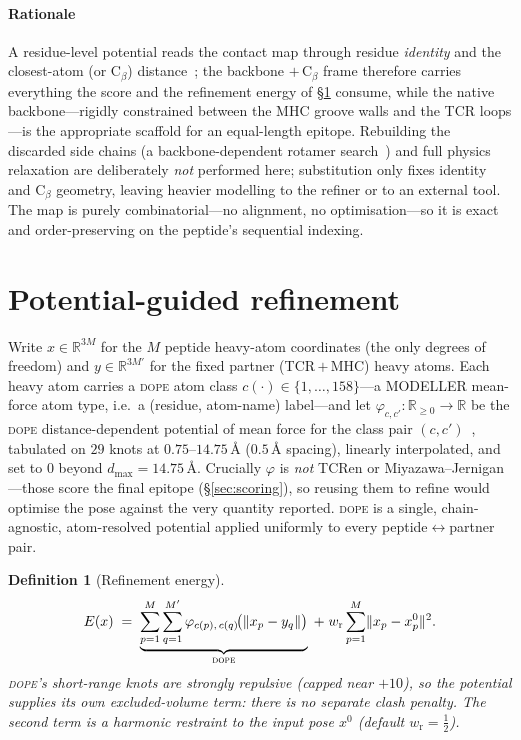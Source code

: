 \documentclass[11pt]{article}
\theoremstyle{oldplain}
\theoremstyle{oldrem}
\newtheorem{definition}{Definition}
\newcommand{\R}{\mathbb{R}}
\newcommand{\xref}{x^{0}}
\begin{document}
\paragraph{Rationale} A residue-level potential reads the contact map through residue
\emph{identity} and the closest-atom (or $\mathrm C_\beta$) distance~\cite{Miyazawa1996}; the
backbone $+\,\mathrm C_\beta$ frame therefore carries everything the score and the refinement energy
of \S\ref{sec:refine} consume, while the native backbone---rigidly constrained between the MHC
groove walls and the TCR loops---is the appropriate scaffold for an equal-length epitope. Rebuilding
the discarded side chains (a backbone-dependent rotamer search~\cite{Shapovalov2011}) and full
physics relaxation are deliberately \emph{not} performed here; substitution only fixes identity and
$\mathrm C_\beta$ geometry, leaving heavier modelling to the refiner or to an external tool. The map
is purely combinatorial---no alignment, no optimisation---so it is exact and order-preserving on the
peptide's sequential indexing.

\section{Potential-guided refinement}\label{sec:refine}
Write $x\in\R^{3M}$ for the $M$ peptide heavy-atom coordinates (the only degrees of freedom) and
$y\in\R^{3M'}$ for the fixed partner (TCR\,$+$\,MHC) heavy atoms. Each heavy atom carries a
\textsc{dope} atom class $c(\cdot)\in\{1,\dots,158\}$---a MODELLER mean-force atom type, i.e.\ a
(residue, atom-name) label---and let $\varphi_{c,c'}:\R_{\ge0}\to\R$ be the \textsc{dope}
distance-dependent potential of mean force for the class pair $(c,c')$~\cite{Shen2006}, tabulated on
$29$ knots at $0.75$--$14.75\,\text{\AA}$ ($0.5\,\text{\AA}$ spacing), linearly interpolated, and set
to $0$ beyond $d_{\max}=14.75\,\text{\AA}$. Crucially $\varphi$ is \emph{not} TCRen or
Miyazawa--Jernigan---those score the final epitope (\S\ref{sec:scoring}), so reusing them to refine
would optimise the pose against the very quantity reported. \textsc{dope} is a single, chain-agnostic,
atom-resolved potential applied uniformly to every peptide$\leftrightarrow$partner pair.
\begin{definition}[Refinement energy]\label{def:energy}
\[
  E(x) \;=\;
  \underbrace{\sum_{p=1}^{M}\sum_{q=1}^{M'} \varphi_{c(p),\,c(q)}\!\bigl(\lVert x_p - y_q\rVert\bigr)}_{\text{\textsc{dope}}}
  \;+\;
  w_{\mathrm r}\sum_{p=1}^{M}\lVert x_p-\xref_p\rVert^2 .
\]
\textsc{dope}'s short-range knots are strongly repulsive (capped near $+10$), so the potential
supplies its own excluded-volume term: there is no separate clash penalty. The second term is a
harmonic restraint to the input pose $\xref$ (default $w_{\mathrm r}=\tfrac12$).
\end{definition}
\end{document}
